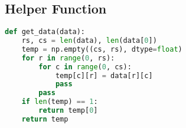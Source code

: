 \subsection{Helper Function}\label{subsec:get-data-helper-function}
\begin{lstlisting}[language=Python]
def get_data(data):
    rs, cs = len(data), len(data[0])
    temp = np.empty((cs, rs), dtype=float)
    for r in range(0, rs):
        for c in range(0, cs):
            temp[c][r] = data[r][c]
            pass
        pass
    if len(temp) == 1:
        return temp[0]
    return temp
\end{lstlisting}
